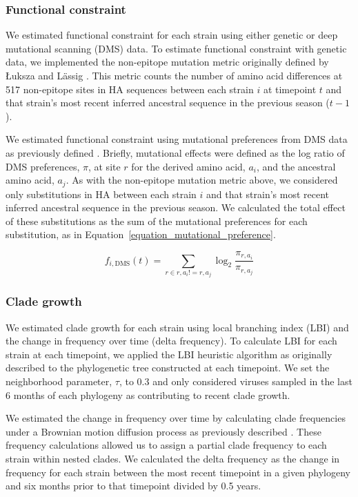 \subsubsection*{Functional constraint}

We estimated functional constraint for each strain using either genetic or deep mutational scanning (DMS) data.
To estimate functional constraint with genetic data, we implemented the non-epitope mutation metric originally defined by {\L}uksza and L\"assig \cite{Luksza:2014hj}.
This metric counts the number of amino acid differences at 517 non-epitope sites in HA sequences between each strain $i$ at timepoint $t$ and that strain's most recent inferred ancestral sequence in the previous season ($t - 1$).

We estimated functional constraint using mutational preferences from DMS data as previously defined \cite{Lee2018}.
Briefly, mutational effects were defined as the log ratio of DMS preferences, $\pi$, at site $r$ for the derived amino acid, $a_{i}$, and the ancestral amino acid, $a_{j}$.
As with the non-epitope mutation metric above, we considered only substitutions in HA between each strain $i$ and that strain's most recent inferred ancestral sequence in the previous season.
We calculated the total effect of these substitutions as the sum of the mutational preferences for each substitution, as in Equation~\ref{equation_mutational_preference}.

\begin{equation}
    f_{i,\mathrm{DMS}}(t) = \sum_{r \in r,a_{i} != r,a_{j}}\log_{2}\frac{\pi_{r,a_{i}}}{\pi_{r,a_{j}}}
    \label{equation_mutational_preference}
\end{equation}

\subsubsection*{Clade growth}

We estimated clade growth for each strain using local branching index (LBI) and the change in frequency over time (delta frequency).
To calculate LBI for each strain at each timepoint, we applied the LBI heuristic algorithm as originally described \cite{Neher:2014eu} to the phylogenetic tree constructed at each timepoint.
We set the neighborhood parameter, $\tau$, to 0.3 and only considered viruses sampled in the last 6 months of each phylogeny as contributing to recent clade growth.

We estimated the change in frequency over time by calculating clade frequencies under a Brownian motion diffusion process as previously described \cite{Lee2018}.
These frequency calculations allowed us to assign a partial clade frequency to each strain within nested clades.
We calculated the delta frequency as the change in frequency for each strain between the most recent timepoint in a given phylogeny and six months prior to that timepoint divided by 0.5 years.
